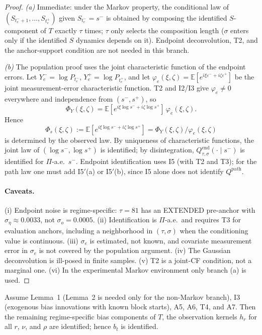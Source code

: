 \begin{proof}
\emph{(a)} Immediate: under the Markov property, the conditional law of
$(S_{t_e^-+1},\dots,S_{t_e^+})$ given $S_{t_e^-}=s^-$ is obtained by composing
the identified $S$-component of $T$ exactly $\tau$ times; $\tau$ only selects
the composition length ($\sigma$ enters only if the identified $S$ dynamics
depends on it).  Endpoint deconvolution, T2, and the anchor-support condition
are not needed in this branch.

\emph{(b)} The population proof uses the joint characteristic function of the
endpoint errors.  Let
$Y_e^-=\log P_{t_e^-}$, $Y_e^+=\log P_{t_e^+}$, and let
$\varphi_e(\xi,\zeta)=\mathbb E[e^{i\xi\varepsilon^-+i\zeta\varepsilon^+}]$ be
the joint measurement-error characteristic function.  T2 and I2/I3 give
$\varphi_e\ne0$ everywhere and independence from $(s^-,s^+)$, so
\[
\Phi_Y(\xi,\zeta)
=\mathbb E[e^{i\xi\log s^-+i\zeta\log s^+}]\,\varphi_e(\xi,\zeta).
\]
Hence
\[
\Phi_s(\xi,\zeta):=\mathbb E[e^{i\xi\log s^-+i\zeta\log s^+}]
=\Phi_Y(\xi,\zeta)/\varphi_e(\xi,\zeta)
\]
is determined by the observed law.  By uniqueness of characteristic functions,
the joint law of $(\log s^-,\log s^+)$ is identified; by disintegration,
$Q^{\mathrm{end}}_{\tau,\sigma}(\cdot\mid s^-)$ is identified for $\Pi$-a.e.\
$s^-$.  Endpoint identification uses I5 (with T2 and T3); for the path law one
must add I5$'$(a) or I5$'$(b), since I5 alone does not identify
$Q^{\mathrm{path}}$.

\paragraph{Caveats.}
(i) Endpoint noise is regime-specific: $\tau=81$ has an EXTENDED pre-anchor with
$\sigma_\eta\approx0.0033$, not $\sigma_o=0.0005$.  (ii) Identification is
$\Pi$-a.e.\ and requires T3 for evaluation anchors, including a neighborhood in
$(\tau,\sigma)$ when the conditioning value is continuous.  (iii) $\sigma_e$ is
estimated, not known, and covariate measurement error in $\sigma_e$ is not
covered by the population argument.  (iv) The Gaussian deconvolution is
ill-posed in finite samples.  (v) T2 is a joint-CF condition, not a marginal one.
(vi) In the experimental Markov environment only branch (a) is used.
\end{proof}

\begin{aIlemC}
Assume Lemma~1 (Lemma~2 is needed only for the non-Markov branch), I3 (exogenous
bias innovations with known block starts), A5, A6, T4, and A7.  Then the
remaining regime-specific bias components of $T$, the observation kernels $h_r$
for all $r$, $\nu$, and $\rho$ are identified; hence $b_t$ is identified.
\end{aIlemC}

